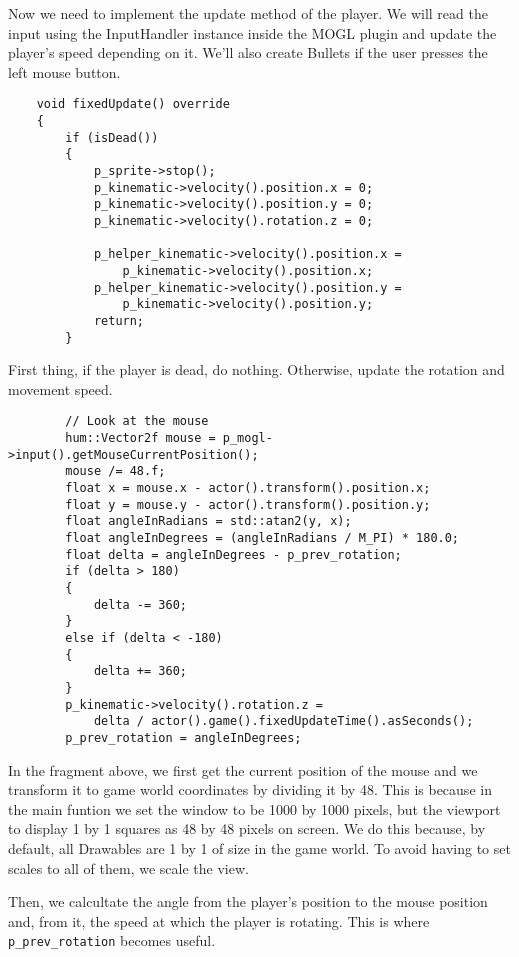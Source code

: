 Now we need to implement the update method of the player. We will read the input using 
the InputHandler instance inside the MOGL plugin and update the player's speed depending 
on it. We'll also create Bullets if the user presses the left mouse button.

\begin{lstlisting}
    void fixedUpdate() override
    {
        if (isDead())
        {
            p_sprite->stop();
            p_kinematic->velocity().position.x = 0;
            p_kinematic->velocity().position.y = 0;
            p_kinematic->velocity().rotation.z = 0;

            p_helper_kinematic->velocity().position.x =
                p_kinematic->velocity().position.x;
            p_helper_kinematic->velocity().position.y =
                p_kinematic->velocity().position.y;
            return;
        }
\end{lstlisting}

First thing, if the player is dead, do nothing. Otherwise, update the rotation and movement 
speed.

\begin{lstlisting}
        // Look at the mouse
        hum::Vector2f mouse = p_mogl->input().getMouseCurrentPosition();
        mouse /= 48.f;
        float x = mouse.x - actor().transform().position.x;
        float y = mouse.y - actor().transform().position.y;
        float angleInRadians = std::atan2(y, x);
        float angleInDegrees = (angleInRadians / M_PI) * 180.0;
        float delta = angleInDegrees - p_prev_rotation;
        if (delta > 180)
        {
            delta -= 360;
        }
        else if (delta < -180)
        {
            delta += 360;
        }
        p_kinematic->velocity().rotation.z =
            delta / actor().game().fixedUpdateTime().asSeconds();
        p_prev_rotation = angleInDegrees;
\end{lstlisting}

In the fragment above, we first get the current position of the mouse and we transform 
it to game world coordinates by dividing it by 48. This is because in the main funtion 
we set the window to be 1000 by 1000 pixels, but the viewport to display 1 by 1 squares 
as 48 by 48 pixels on screen.  We do this because, by default, all Drawables are 1 
by 1 of size in the game world. To avoid having to set scales to all of them, we scale 
the view.

Then, we calcultate the angle from the player's position to the mouse position and, from it, 
the speed at which the player is rotating. This is where \texttt{p\_prev\_rotation} becomes useful.

